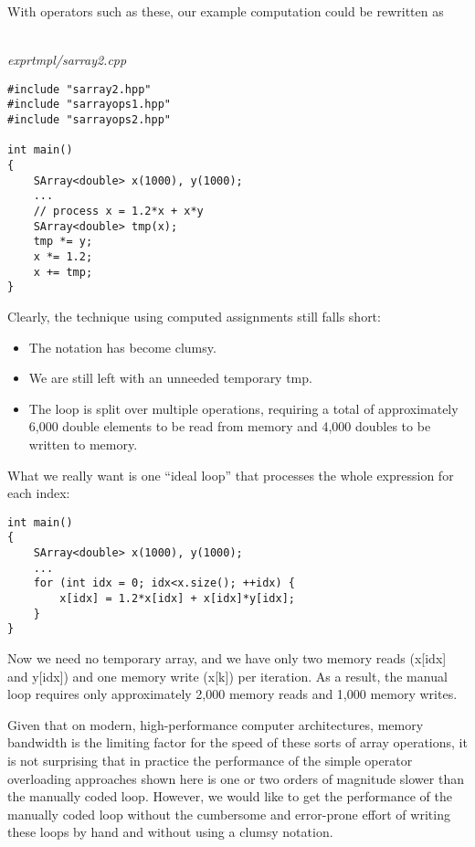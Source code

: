 With operators such as these, our example computation could be rewritten as

\hspace*{\fill} \\ %
\noindent
\textit{exprtmpl/sarray2.cpp}
\begin{lstlisting}[style=styleCXX]
#include "sarray2.hpp"
#include "sarrayops1.hpp"
#include "sarrayops2.hpp"

int main()
{
	SArray<double> x(1000), y(1000);
	...
	// process x = 1.2*x + x*y
	SArray<double> tmp(x);
	tmp *= y;
	x *= 1.2;
	x += tmp;
}
\end{lstlisting}

Clearly, the technique using computed assignments still falls short:

\begin{itemize}
\item 
The notation has become clumsy.

\item 
We are still left with an unneeded temporary tmp.

\item 
The loop is split over multiple operations, requiring a total of approximately 6,000 double elements to be read from memory and 4,000 doubles to be written to memory.
\end{itemize}

What we really want is one “ideal loop” that processes the whole expression for each index:

\begin{lstlisting}[style=styleCXX]
int main()
{
	SArray<double> x(1000), y(1000);
	...
	for (int idx = 0; idx<x.size(); ++idx) {
		x[idx] = 1.2*x[idx] + x[idx]*y[idx];
	}
}
\end{lstlisting}

Now we need no temporary array, and we have only two memory reads (x[idx] and y[idx]) and one memory write (x[k]) per iteration. As a result, the manual loop requires only approximately 2,000 memory reads and 1,000 memory writes.

Given that on modern, high-performance computer architectures, memory bandwidth is the limiting factor for the speed of these sorts of array operations, it is not surprising that in practice the performance of the simple operator overloading approaches shown here is one or two orders of magnitude slower than the manually coded loop. However, we would like to get the performance of the manually coded loop without the cumbersome and error-prone effort of writing these loops by hand and without using a clumsy notation.















